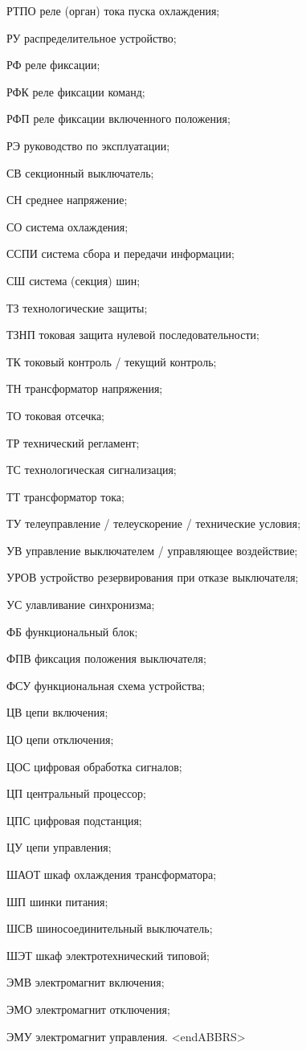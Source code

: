 \begin{list}{}
\item[РТПО] реле (орган) тока пуска охлаждения;
\item[РУ] распределительное устройство;
\item[РФ] реле фиксации;
\item[РФК] реле фиксации команд;
\item[РФП] реле фиксации включенного положения;
\item[РЭ] руководство по эксплуатации;
\item[СВ] секционный выключатель;
\item[СН] среднее напряжение;
\item[СО] система охлаждения;
\item[ССПИ] система сбора и передачи информации;
\item[СШ] система (секция) шин;
\item[ТЗ] технологические защиты;
\item[ТЗНП] токовая защита нулевой последовательности;
\item[ТК] токовый контроль / текущий контроль;
\item[ТН] трансформатор напряжения;
\item[ТО] токовая отсечка;
\item[ТР] технический регламент;
\item[ТС] технологическая сигнализация;
\item[ТТ] трансформатор тока;
\item[ТУ] телеуправление / телеускорение / технические условия;
\item[УВ] управление выключателем / управляющее воздействие;
\item[УРОВ] устройство резервирования при отказе выключателя;
\item[УС] улавливание синхронизма;
\item[ФБ] функциональный блок;
\item[ФПВ] фиксация положения выключателя;
\item[ФСУ] функциональная схема устройства;
\item[ЦВ] цепи включения;
\item[ЦО] цепи отключения;
\item[ЦОС] цифровая обработка сигналов;
\item[ЦП] центральный процессор;
\item[ЦПС] цифровая подстанция;
\item[ЦУ] цепи управления;
\item[ШАОТ] шкаф охлаждения трансформатора;
\item[ШП] шинки питания;
\item[ШСВ] шиносоединительный выключатель;
\item[ШЭТ] шкаф электротехнический типовой;
\item[ЭМВ] электромагнит включения;
\item[ЭМО] электромагнит отключения;
\item[ЭМУ] электромагнит управления.
{\color{white}\fontsize{0.1pt}{0.1pt}\selectfont<endABBRS>}
\end{list}
